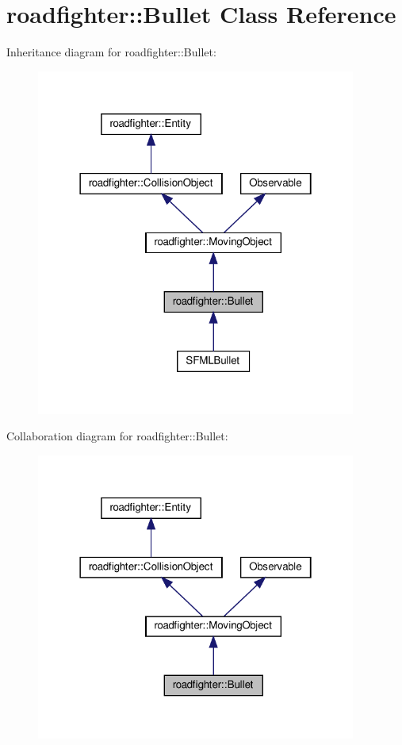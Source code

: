 \hypertarget{classroadfighter_1_1Bullet}{}\section{roadfighter\+:\+:Bullet Class Reference}
\label{classroadfighter_1_1Bullet}


Inheritance diagram for roadfighter\+:\+:Bullet\+:\nopagebreak
\begin{figure}[H]
\begin{center}
\leavevmode
\includegraphics[width=298pt]{classroadfighter_1_1Bullet__inherit__graph}
\end{center}
\end{figure}


Collaboration diagram for roadfighter\+:\+:Bullet\+:\nopagebreak
\begin{figure}[H]
\begin{center}
\leavevmode
\includegraphics[width=298pt]{classroadfighter_1_1Bullet__coll__graph}
\end{center}
\end{figure}
